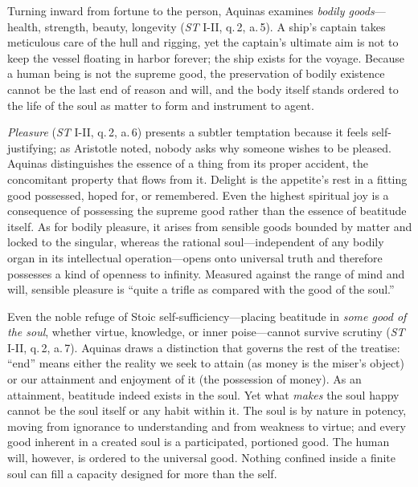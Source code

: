 Turning inward from fortune to the person, Aquinas examines \emph{bodily goods}---health, strength, beauty, longevity (\emph{ST} I-II, q.\,2, a.\,5). A ship's captain takes meticulous care of the hull and rigging, yet the captain's ultimate aim is not to keep the vessel floating in harbor forever; the ship exists for the voyage. Because a human being is not the supreme good, the preservation of bodily existence cannot be the last end of reason and will, and the body itself stands ordered to the life of the soul as matter to form and instrument to agent.

\emph{Pleasure} (\emph{ST} I-II, q.\,2, a.\,6) presents a subtler temptation because it feels self-justifying; as Aristotle noted, nobody asks why someone wishes to be pleased. Aquinas distinguishes the essence of a thing from its proper accident, the concomitant property that flows from it. Delight is the appetite's rest in a fitting good possessed, hoped for, or remembered. Even the highest spiritual joy is a consequence of possessing the supreme good rather than the essence of beatitude itself. As for bodily pleasure, it arises from sensible goods bounded by matter and locked to the singular, whereas the rational soul---independent of any bodily organ in its intellectual operation---opens onto universal truth and therefore possesses a kind of openness to infinity. Measured against the range of mind and will, sensible pleasure is ``quite a trifle as compared with the good of the soul.''

Even the noble refuge of Stoic self-sufficiency---placing beatitude in \emph{some good of the soul}, whether virtue, knowledge, or inner poise---cannot survive scrutiny (\emph{ST} I-II, q.\,2, a.\,7). Aquinas draws a distinction that governs the rest of the treatise: ``end'' means either the reality we seek to attain (as money is the miser's object) or our attainment and enjoyment of it (the possession of money). As an attainment, beatitude indeed exists in the soul. Yet what \emph{makes} the soul happy cannot be the soul itself or any habit within it. The soul is by nature in potency, moving from ignorance to understanding and from weakness to virtue; and every good inherent in a created soul is a participated, portioned good. The human will, however, is ordered to the universal good. Nothing confined inside a finite soul can fill a capacity designed for more than the self.

